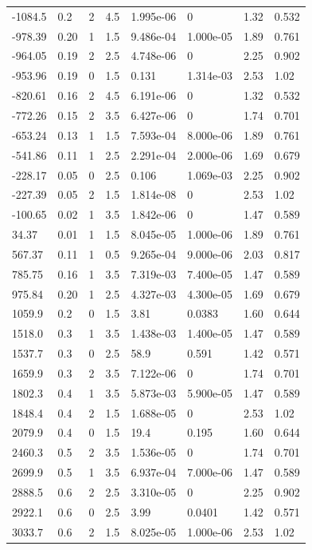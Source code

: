 \documentclass[preview]{standalone}
\begin{document}
{{\begin{tabular}{L{1.2cm}C{1.2cm} C{0.3cm}C{0.5cm} C{1.4cm}C{1.4cm} C{1.4cm}C{1.4cm}}
  -1084.5  &   0.2  & 2     & 4.5 &  1.995e-06  & 0  & 1.32 &  0.532   \\ 
  -978.39  &  0.20  & 1     & 1.5 &  9.486e-04  & 1.000e-05  & 1.89 &  0.761   \\ 
  -964.05  &  0.19  & 2     & 2.5 &  4.748e-06  & 0  & 2.25 &  0.902   \\ 
  -953.96  &  0.19  & 0     & 1.5 &  0.131  & 1.314e-03  & 2.53 &  1.02   \\ 
  -820.61  &  0.16  & 2     & 4.5 &  6.191e-06  & 0  & 1.32 &  0.532   \\ 
  -772.26  &  0.15  & 2     & 3.5 &  6.427e-06  & 0  & 1.74 &  0.701   \\ 
  -653.24  &  0.13  & 1     & 1.5 &  7.593e-04  & 8.000e-06  & 1.89 &  0.761   \\ 
  -541.86  &  0.11  & 1     & 2.5 &  2.291e-04  & 2.000e-06  & 1.69 &  0.679   \\ 
  -228.17  &  0.05  & 0     & 2.5 &  0.106  & 1.069e-03  & 2.25 &  0.902   \\ 
  -227.39  &  0.05  & 2     & 1.5 &  1.814e-08  & 0  & 2.53 &  1.02   \\ 
  -100.65  &  0.02  & 1     & 3.5 &  1.842e-06  & 0  & 1.47 &  0.589   \\ 
  34.37  &  0.01  & 1     & 1.5 &  8.045e-05  & 1.000e-06  & 1.89 &  0.761   \\ 
  567.37  &  0.11  & 1     & 0.5 &  9.265e-04  & 9.000e-06  & 2.03 &  0.817   \\ 
  785.75  &  0.16  & 1     & 3.5 &  7.319e-03  & 7.400e-05  & 1.47 &  0.589   \\ 
  975.84  &  0.20  & 1     & 2.5 &  4.327e-03  & 4.300e-05  & 1.69 &  0.679   \\ 
  1059.9  &   0.2  & 0     & 1.5 &  3.81  & 0.0383  & 1.60 &  0.644   \\ 
  1518.0  &   0.3  & 1     & 3.5 &  1.438e-03  & 1.400e-05  & 1.47 &  0.589   \\ 
  1537.7  &   0.3  & 0     & 2.5 &  58.9  & 0.591  & 1.42 &  0.571   \\ 
  1659.9  &   0.3  & 2     & 3.5 &  7.122e-06  & 0  & 1.74 &  0.701   \\ 
  1802.3  &   0.4  & 1     & 3.5 &  5.873e-03  & 5.900e-05  & 1.47 &  0.589   \\ 
  1848.4  &   0.4  & 2     & 1.5 &  1.688e-05  & 0  & 2.53 &  1.02   \\ 
  2079.9  &   0.4  & 0     & 1.5 &  19.4  & 0.195  & 1.60 &  0.644   \\ 
  2460.3  &   0.5  & 2     & 3.5 &  1.536e-05  & 0  & 1.74 &  0.701   \\ 
  2699.9  &   0.5  & 1     & 3.5 &  6.937e-04  & 7.000e-06  & 1.47 &  0.589   \\ 
  2888.5  &   0.6  & 2     & 2.5 &  3.310e-05  & 0  & 2.25 &  0.902   \\ 
  2922.1  &   0.6  & 0     & 2.5 &  3.99  & 0.0401  & 1.42 &  0.571   \\ 
  3033.7  &   0.6  & 2     & 1.5 &  8.025e-05  & 1.000e-06  & 2.53 &  1.02   \\ 
\hline 
\end{tabular} 

}}
\end{document}
